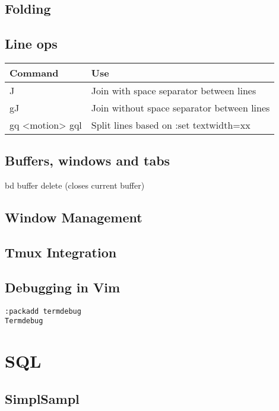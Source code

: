 \documentclass[12pt,a4paper]{article}
\begin{document}
\subsection{Folding}
\subsection{Line ops}

\begin{center}
\begin{table}[!htbp]
\begin{tabu}{ X[l] X[l] }
\hline
Command& Use\\
\hline
\hline
J & Join with space separator between lines\\
gJ & Join without space separator between lines\\
gq <motion> gql & Split lines based on :set textwidth=xx\\
\hline
\end{tabu}
\end{table}
\end{center}


\subsection{Buffers, windows and tabs}
bd buffer delete (closes current buffer)

\subsection{Window Management}

\subsection{Tmux Integration}
\subsection{Debugging in Vim}

\begin{center}
\begin{lstlisting}[]
:packadd termdebug
Termdebug
\end{lstlisting}
\end{center}

\section{SQL}
\subsection{SimplSampl}
\end{document}
